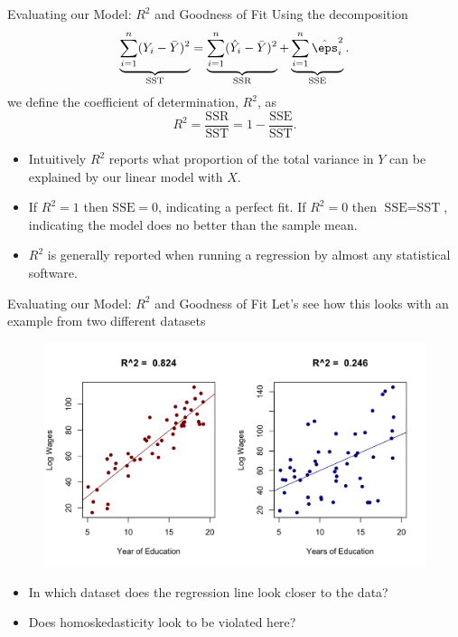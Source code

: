 \documentclass[notheorems, 9pt, handout]{beamer}
\begin{document}
\begin{frame}{Evaluating our Model: \(R^2\) and Goodness of Fit} 
	\label{frame:f11}
	Using the decomposition
	\[
		\underbrace{\sum_{i=1}^n (Y_i - \bar Y)^2}_{\text{SST}} = \underbrace{\sum_{i=1}^n  (\hat Y_i - \bar Y)^2}_{\text{SSR}} +\underbrace{\sum_{i=1}^n \hat\eps_i^2}_{\text{SSE}}
	.\] 
	we define the coefficient of determination, \(R^2\), as
	\[
		R^2 = \frac{\text{SSR}}{\text{SST}} = 1 - \frac{\text{SSE}}{\text{SST}}  
	.\]
	\onslide<2->
	\begin{itemize}
		\item<2-> Intuitively \(R^2\) reports what proportion of the total variance in  \(Y\) can be explained by our linear model with  \(X\).
		\item<3-> If \(R^2=1\) then  \(\text{SSE} = 0\), indicating a perfect fit. If \(R^2=0\) then  \(\text{SSE} = \text{SST}\), indicating the model does no better than the sample mean.
		\item<4-> \(R^2\) is generally reported when running a regression by almost any statistical software.
	\end{itemize}
\end{frame}
\begin{frame}{Evaluating our Model: \(R^2\) and Goodness of Fit} 
	\label{frame:f12}
	Let's see how this looks with an example from two different datasets
	\begin{figure}[htpb]
		\centering
		\includegraphics[width=0.8\linewidth]{R2.png}
	\end{figure}
	\begin{itemize}
		\item<2-> In which dataset does the regression line look closer to the data?
		\item<3-> Does homoskedasticity look to be violated here?
	\end{itemize}
\end{frame}
\end{document}
